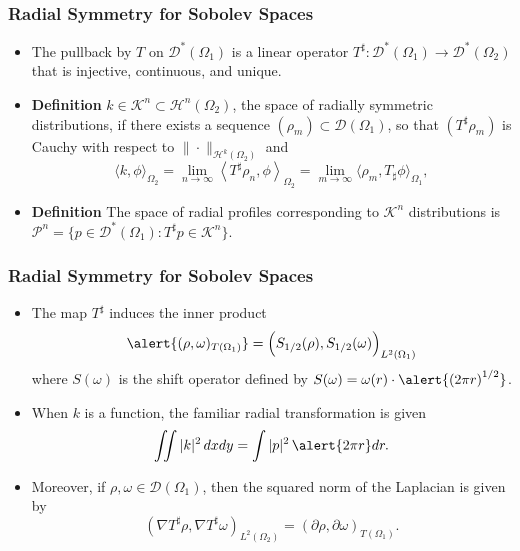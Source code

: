 \documentclass[]{beamer}
\newcommand{\HH}{\ensuremath{\mathscr H}} %
\newcommand{\KK}{\ensuremath{\mathscr K}}
\newcommand{\pp}{\ensuremath{\mathscr P}}
\newcommand{\DD}{\ensuremath{\mathscr D}}
\newcommand{\del}{\partial}
\begin{document}
\begin{frame}[t]
  \frametitle{Radial Symmetry for Sobolev Spaces}
  \begin{itemize}
    \itemsep 1.2em
    \item The pullback by $T$ on $\DD^*(\Omega_1)$ is a linear operator $T^\sharp:\DD^*(\Omega_1) \to \DD^*(\Omega_2)$ that is \alert{injective, continuous, and unique}. %
    \item {\bf Definition} $k\in \KK^n \subset \HH^n(\Omega_2)$, the space of \alert{radially symmetric distributions}, if there exists a sequence $(\rho_m) \subset \DD(\Omega_1)$, so that $(T^\sharp \rho_m)$ is Cauchy with respect to $\|\cdot \|_{\HH^k(\Omega_2)}$ and
  $$
  \Big\langle k,\phi\Big\rangle_{\Omega_2} = \lim_{n\to\infty}\left\langle T^\sharp \rho_n, \phi\right\rangle_{\Omega_2} = \lim_{m\to\infty}\Big\langle \rho_m, T_\sharp \phi\Big\rangle_{\Omega_1},
  $$
    \item {\bf Definition} The space of \alert{radial profiles} corresponding to $\KK^n$ distributions is $\pp^n = \{p \in \DD^*(\Omega_1): T^\sharp p \in \KK^n\}$.
  \end{itemize}
\end{frame}

\begin{frame}[t]
  \frametitle{Radial Symmetry for Sobolev Spaces}
  \begin{itemize}
    \itemsep 1.2em
    \item The map $T^\sharp$ induces the inner product 
    $$
    \alert{(\rho,\omega)_{T(\Omega_1)}} = \Big( S_{1/2}(\rho),S_{1/2}(\omega) \Big)_{L^2(\Omega_1)}  %
    $$ 
    where $S(\omega)$ is the \alert{shift operator} defined by $S(\omega) = \omega(r)\cdot\alert{\left(2\pi r\right)^{1/2}}$.
    \item When $k$ is a function, the familiar radial transformation is given
    $$
      \iint |k|^2\,dxdy = \int |p|^2 \,\alert{2\pi r}dr.
    $$
    \item Moreover, if $\rho,\omega \in \DD(\Omega_1)$, then \alert{the squared norm of the Laplacian} is given by 
    $$
      (\nabla T^\sharp \rho, \nabla T^\sharp \omega)_{L^2(\Omega_2)} = (\del \rho,\del \omega)_{T(\Omega_1)}.
    $$
  \end{itemize}
\end{frame}
\end{document}

